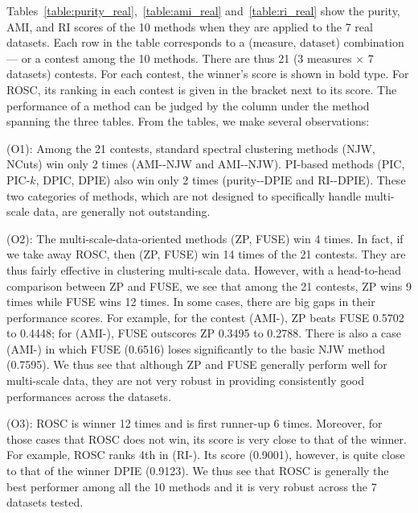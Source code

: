 
Tables~\ref{table:purity_real},~\ref{table:ami_real} and~\ref{table:ri_real} 
show the purity, AMI, and RI scores of the 10 methods when they are applied to the 7 real datasets.
Each row in the table corresponds to a (measure, dataset) combination --- or a contest
among the 10 methods. There are thus 21 (3 measures $\times$ 7 datasets) contests.
For each contest, the winner's score is shown in bold type.
For ROSC, its ranking in each contest is given in the bracket next to its score. 
The performance of a method can be judged by the column under the method spanning the three
tables. 
From the tables, we make several observations:

(O1): Among the 21 contests, standard spectral clustering methods (NJW, NCuts) win only 2 times (AMI-\glass-NJW and AMI-\isolet-NJW).
PI-based methods (PIC, PIC-$k$, DPIC, DPIE) also win only 2 times
(purity-\isolet-DPIE and RI-\isolet-DPIE).
These two categories of methods, which are not designed to specifically handle
multi-scale data, are generally not outstanding. 

(O2): The multi-scale-data-oriented methods (ZP, FUSE) win 4 times. In fact, if we take away 
ROSC, then (ZP, FUSE) win 14 times of the 21 contests. They are thus fairly effective in clustering
multi-scale data. 
However, with a head-to-head comparison between ZP and FUSE, we see that 
among the 21 contests, ZP wins 9 times while FUSE wins 12 times. 
In some cases, there are big gaps in their performance scores.
For example, for the contest (AMI-\coil), ZP beats FUSE 0.5702 to 0.4448;
for (AMI-\yale), FUSE outscores ZP 0.3495 to 0.2788.
There is also a case (AMI-\isolet) in which FUSE (0.6516) loses significantly to the basic NJW method (0.7595).
We thus see that although ZP and FUSE generally perform well for multi-scale data, they are not very
robust in providing consistently good performances across the datasets. 

(O3): ROSC is winner 12 times and is first runner-up 6 times. Moreover, for those cases that ROSC does
not win, its score is very close to that of the winner.  
For example, ROSC ranks 4th in (RI-\isolet). Its score (0.9001), however, is quite close to that of
the winner DPIE (0.9123).
We thus see that ROSC is generally the best performer among all the 10 methods and it is very robust
across the 7 datasets tested. 

